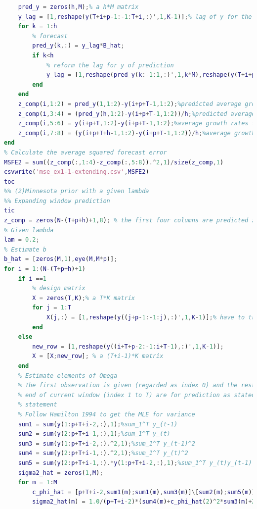 \documentclass[11pt, oneside]{article}   	%
\begin{document}
\begin{lstlisting}[language=Matlab ,caption={Matlab code for problem 1.}, label={code:prob1}]
    % for h = 1 & 4
    pred_y = zeros(h,M);% a h*M matrix
    y_lag = [1,reshape(y(T+i+p-1:-1:T+i,:)',1,K-1)];% lag of y for the prediction
    for k = 1:h
        % forecast
        pred_y(k,:) = y_lag*B_hat;
        if k<h
            % reform the lag for y of prediction
            y_lag = [1,reshape(pred_y(k:-1:1,:)',1,k*M),reshape(y(T+i+p-1:-1:T+i+k,:)',1,K-1-k*M)];
        end
    end
    z_comp(i,1:2) = pred_y(1,1:2)-y(i+p+T-1,1:2);%predicted average growth rates for one quarter of (i) log-real GDP and (ii) log-GDP delector
    z_comp(i,3:4) = (pred_y(h,1:2)-y(i+p+T-1,1:2))/h;%predicted average growth rates for h quarters of (i) log-real GDP and (ii) log-GDP delector
    z_comp(i,5:6) = y(i+p+T,1:2)-y(i+p+T-1,1:2);%average growth rates for one quarter of (i) log-real GDP and (ii) log-GDP delector
    z_comp(i,7:8) = (y(i+p+T+h-1,1:2)-y(i+p+T-1,1:2))/h;%average growth rates for h quarters of (i) log-real GDP and (ii) log-GDP delector
end
% Calculate the average squared forecast error
MSFE2 = sum((z_comp(:,1:4)-z_comp(:,5:8)).^2,1)/size(z_comp,1)
csvwrite('mse_ex1-1-extending.csv',MSFE2)
toc
%% (2)Minnesota prior with a given lambda
%% Expanding window prediction
tic
z_comp = zeros(N-(T+p+h)+1,8); % the first four columns are predicted z (average growth rate of GDP) and the second four columns is the real z
% Given lambda
lam = 0.2;
% Estimate b
b_hat = [zeros(M,1),eye(M,M*p)];
for i = 1:(N-(T+p+h)+1)
    if i ==1
        % design matrix
        X = zeros(T,K);% a T*K matrix
        for j = 1:T
            X(j,:) = [1,reshape(y((j+p-1:-1:j),:)',1,K-1)];% have to transpose because the reshape function operate in column
        end
    else
        new_row = [1,reshape(y((i+T+p-2:-1:i+T-1),:)',1,K-1)];
        X = [X;new_row]; % a (T+i-1)*K matrix
    end
    % Estimate elements of Omega
    % The first observation is given (regarded as index 0) and the rest of observation up to the
    % end of current window (index 1 to T) are for prediction as stated in the problem
    % statement
    % Follow Hamilton 1994 to get the MLE for variance
    sum1 = sum(y(1:p+T+i-2,:),1);%sum_1^T y_(t-1)
    sum2 = sum(y(2:p+T+i-1,:),1);%sum_1^T y_(t)
    sum3 = sum(y(1:p+T+i-2,:).^2,1);%sum_1^T y_(t-1)^2
    sum4 = sum(y(2:p+T+i-1,:).^2,1);%sum_1^T y_(t)^2
    sum5 = sum(y(2:p+T+i-1,:).*y(1:p+T+i-2,:),1);%sum_1^T y_(t)y_(t-1)
    sigma2_hat = zeros(1,M);
    for m = 1:M
        c_phi_hat = [p+T+i-2,sum1(m);sum1(m),sum3(m)]\[sum2(m);sum5(m)];% c_phi_hat = [c_hat,phi_hat]
        sigma2_hat(m) = 1.0/(p+T+i-2)*(sum4(m)+c_phi_hat(2)^2*sum3(m)+2*c_phi_hat(1)*c_phi_hat(2)*sum1(m)...

\end{lstlisting}
\end{document}
